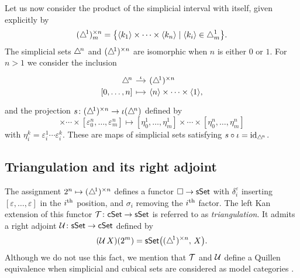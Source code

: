 Let us now consider the product of the simplicial interval with itself, given explicitly by
\begin{equation*}
(\triangle^{\!1})^{\times n}_m = \big\{ \langle k_1 \rangle \times \cdots \times \langle k_n \rangle \mid \langle k_i \rangle \in \triangle^1_m \big\}.
\end{equation*}
The simplicial sets $\triangle^{\!n}$ and $(\triangle^{\!1})^{\times n}$ are isomorphic when $n$ is either $0$ or $1$.
For $n > 1$ we consider the inclusion
\begin{equation*}
\begin{tikzcd}[row sep=-3pt, column sep=small,
/tikz/column 1/.append style={anchor=base east},
/tikz/column 2/.append style={anchor=base west}]
\simplex^{\!n} \arrow[r, "\iota"] & \scube{n} \\
{[0, \dots, n]} \arrow[r, mapsto] & \angles{n} \times \cdots \times \angles{1},
\end{tikzcd}
\end{equation*}
and the projection $s \colon (\triangle^{\!1})^{\times n} \to \iota(\triangle^{\!n})$ defined by
\begin{equation*}
[ \varepsilon_0^1, \dots, \varepsilon_m^1] \times \cdots \times [ \varepsilon_0^n, \dots, \varepsilon_m^n] \mapsto [ \eta_0^1, \dots, \eta_m^1] \times \cdots \times [ \eta_0^n, \dots, \eta_m^n]
\end{equation*}
with $\eta_i^k = \varepsilon_i^1 \cdots \varepsilon_i^k$.
These are maps of simplicial sets satisfying $s \circ \iota = \mathrm{id}_{\triangle^{\!n}}$.

\subsection{Triangulation and its right adjoint} \label{triangulation and its right adjoint}

The assignment $2^n \mapsto (\triangle^{\!1})^{\times n}$ defines a functor $\square \to \mathsf{sSet}$ with $\delta_i^\varepsilon$ inserting $[\varepsilon, \dots, \varepsilon]$ in the $i^\mathrm{th}$ position, and $\sigma_i$ removing the $i^\mathrm{th}$ factor.
The left Kan extension of this functor $\operatorname{\mathcal{T}} \colon \mathsf{cSet} \to \mathsf{sSet}$ is referred to as \textit{triangulation}.
It admits a right adjoint $\operatorname{\mathcal{U}} \colon \mathsf{sSet} \to \mathsf{cSet}$ defined by
\begin{equation*}
(\operatorname{\mathcal{U}} X)(2^m) = \mathsf{sSet} \big( (\triangle^{\!1})^{\times n}, \, X \big).
\end{equation*}
Although we do not use this fact, we mention that $\operatorname{\mathcal{T}}$ and $\operatorname{\mathcal{U}}$ define a Quillen equivalence when simplicial and cubical sets are considered as model categories \cite[8.4.30]{cisinski2006presheaves}.

